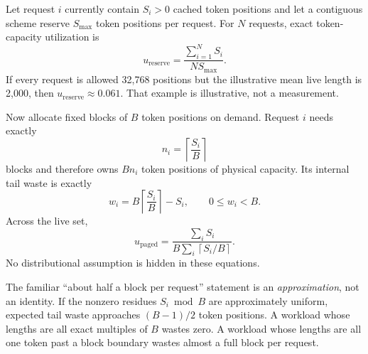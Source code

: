 

Let request $i$ currently contain $S_i>0$ cached token positions and let a
contiguous scheme reserve $S_{\max}$ token positions per request. For $N$
requests, exact token-capacity utilization is
\begin{equation}
u_{\mathrm{reserve}}
 = \frac{\sum_{i=1}^{N}S_i}{N S_{\max}}.
\label{eq:paged-reserve-util}
\end{equation}
If every request is allowed 32,768 positions but the illustrative mean live
length is 2,000, then $u_{\mathrm{reserve}}\approx0.061$. That example is
illustrative, not a measurement.

Now allocate fixed blocks of $B$ token positions on demand. Request $i$ needs
exactly
\begin{equation}
n_i=\left\lceil\frac{S_i}{B}\right\rceil
\label{eq:paged-block-count}
\end{equation}
blocks and therefore owns $Bn_i$ token positions of physical capacity. Its
internal tail waste is exactly
\begin{equation}
w_i = B\left\lceil\frac{S_i}{B}\right\rceil-S_i,
\qquad 0\le w_i < B.
\label{eq:paged-tail-waste}
\end{equation}
Across the live set,
\begin{equation}
u_{\mathrm{paged}}
 = \frac{\sum_i S_i}
        {B\sum_i\left\lceil S_i/B\right\rceil}.
\label{eq:paged-util}
\end{equation}
No distributional assumption is hidden in these equations.

The familiar ``about half a block per request'' statement is an
\emph{approximation}, not an identity. If the nonzero residues $S_i\bmod B$
are approximately uniform, expected tail waste approaches $(B-1)/2$ token
positions. A workload whose lengths are all exact multiples of $B$ wastes
zero. A workload whose lengths are all one token past a block boundary wastes
almost a full block per request.

